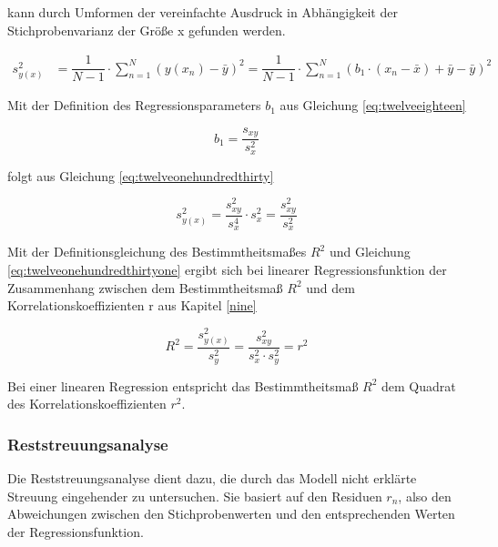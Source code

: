\noindent kann durch Umformen der vereinfachte Ausdruck in Abh\"{a}ngigkeit der Stichprobenvarianz der Gr\"{o}{\ss}e x gefunden werden.

\begin{equation}\label{eq:twelveonehundredtwentynine}
\begin{split}
s_{y(x)}^{2} & =\dfrac{1}{N-1} \cdot \sum _{n=1}^{N}\left(y(x_{n})-\bar{y}\right)^{2}  =\dfrac{1}{N-1} \cdot \sum _{n=1}^{N}\left(b_{1} \cdot (x_{n} -\bar{x})+\bar{y}-\bar{y}\right)^{2}
\end{split}
\end{equation}

\noindent Mit der Definition des Regressionsparameters $b_{1}$ aus Gleichung \eqref{eq:twelveeighteen}

\begin{equation}\label{eq:twelveonehundredthirty}
b_{1} =\dfrac{s_{xy}}{s_{x}^{2}}
\end{equation}

\noindent folgt aus Gleichung \eqref{eq:twelveonehundredthirty} 

\begin{equation}\label{eq:twelveonehundredthirtyone}
s_{y(x)}^{2} =\dfrac{s_{xy}^{2}}{s_{x}^{4}} \cdot s_{x}^{2} =\dfrac{s_{xy}^{2}}{s_{x}^{2}}
\end{equation}

\noindent Mit der Definitionsgleichung des Bestimmtheitsma{\ss}es $R^{2}$ und Gleichung \eqref{eq:twelveonehundredthirtyone} ergibt sich bei linearer Regressionsfunktion der Zusammenhang zwischen dem Bestimmtheitsma{\ss} $R^{2}$ und dem Korrelationskoeffizienten r aus Kapitel \ref{nine}

\begin{equation}\label{eq:twelveonehundredthirtytwo}
R^{2} =\dfrac{s_{y(x)}^{2}}{s_{y}^{2}} =\dfrac{s_{xy}^{2}}{s_{x}^{2} \cdot s_{y}^{2}} =r^{2}
\end{equation}

\noindent Bei einer linearen Regression entspricht das Bestimmtheitsma{\ss} $R^{2}$ dem Quadrat des Korrelationskoeffizienten $r^{2}$.

\subsubsection{Reststreuungsanalyse}

\noindent Die Reststreuungsanalyse dient dazu, die durch das Modell nicht erkl\"{a}rte Streuung eingehender zu untersuchen. Sie basiert auf den Residuen $r_{n}$, also den Abweichungen zwischen den Stichprobenwerten und den entsprechenden Werten der Regressionsfunktion. 

